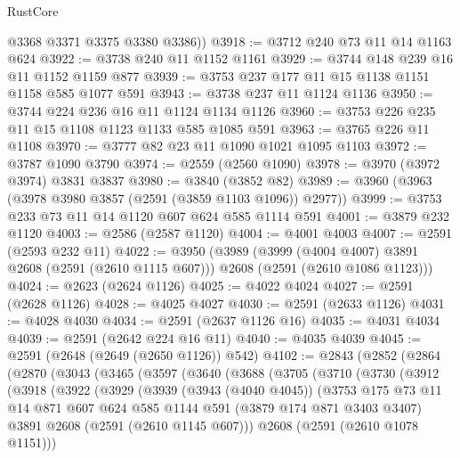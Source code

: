 \begin{lexlean}{RustCore}
\begin{coremodule}
        @3368
        @3371
        @3375
        @3380
        @3386))
@3918 := @3712 @240 @73 @11 @14 @1163 @624
@3922 := @3738 @240 @11 @1152 @1161
@3929 := @3744 @148 @239 @16 @11 @1152 @1159 @877
@3939 := @3753 @237 @177 @11 @15 @1138 @1151 @1158 @585 @1077 @591
@3943 := @3738 @237 @11 @1124 @1136
@3950 := @3744 @224 @236 @16 @11 @1124 @1134 @1126
@3960 := @3753 @226 @235 @11 @15 @1108 @1123 @1133 @585 @1085 @591
@3963 := @3765 @226 @11 @1108
@3970 := @3777 @82 @23 @11 @1090 @1021 @1095 @1103
@3972 := @3787 @1090 @3790
@3974 := @2559 (@2560 @1090)
@3978 := @3970 (@3972 @3974) @3831 @3837
@3980 := @3840 (@3852 @82)
@3989 := @3960 (@3963 (@3978 @3980 @3857 (@2591 (@3859 @1103 @1096)) @2977))
@3999 := @3753 @233 @73 @11 @14 @1120 @607 @624 @585 @1114 @591
@4001 := @3879 @232 @1120
@4003 := @2586 (@2587 @1120)
@4004 := @4001 @4003
@4007 := @2591 (@2593 @232 @11)
@4022 := @3950
    (@3989
      (@3999 (@4004 @4007) @3891 @2608 (@2591 (@2610 @1115 @607)))
      @2608
      (@2591 (@2610 @1086 @1123)))
@4024 := @2623 (@2624 @1126)
@4025 := @4022 @4024
@4027 := @2591 (@2628 @1126)
@4028 := @4025 @4027
@4030 := @2591 (@2633 @1126)
@4031 := @4028 @4030
@4034 := @2591 (@2637 @1126 @16)
@4035 := @4031 @4034
@4039 := @2591 (@2642 @224 @16 @11)
@4040 := @4035 @4039
@4045 := @2591 (@2648 (@2649 (@2650 @1126)) @542)
@4102 := @2843
    (@2852
      (@2864
        (@2870
          (@3043
            (@3465
              (@3597
                (@3640
                  (@3688
                    (@3705
                      (@3710
                        (@3730
                          (@3912
                            (@3918
                              (@3922
                                (@3929
                                  (@3939
                                    (@3943 (@4040 @4045))
                                    (@3753
                                      @175
                                      @73
                                      @11
                                      @14
                                      @871
                                      @607
                                      @624
                                      @585
                                      @1144
                                      @591
                                      (@3879 @174 @871 @3403 @3407)
                                      @3891
                                      @2608
                                      (@2591 (@2610 @1145 @607)))
                                    @2608
                                    (@2591 (@2610 @1078 @1151)))

\end{coremodule}
\end{lexlean}
